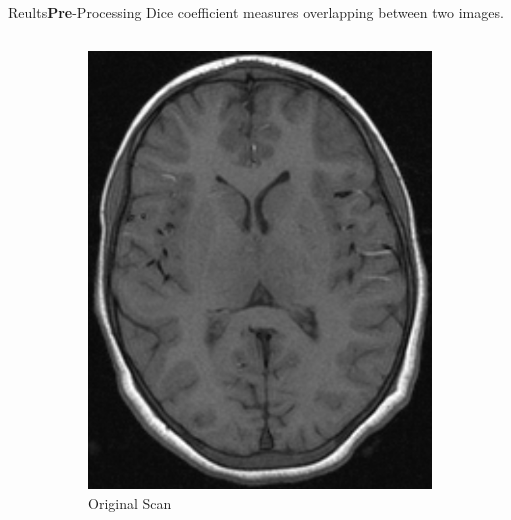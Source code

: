 \documentclass[]{standalone}
\begin{document}
	\begin{frame}{Reults}{\textbf{Pre}-Processing}
	\vspace{-25pt}
	Dice coefficient measures overlapping between two images.
	\begin{columns}
		\begin{column}{0.45\textwidth}
		\begin{figure}[h!]
		\footnotesize
		\centering
			\begin{subfigure}[h!]{0.49\textwidth}
			\hfill
			     \includegraphics[scale=0.11]{./IMG/T1W0.png}
			     \caption*{Original Scan} 
			\end{subfigure}
			\hfill
			\begin{subfigure}[h!]{0.49\textwidth}

\end{subfigure}
\end{figure}
\end{column}
\end{columns}
\end{frame}
\end{document}
